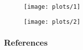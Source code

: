 \documentclass[
    8pt,
    aspectratio=1610,
    c,
    intlimits,
    leqno,
    professionalfonts,
]{beamer}
\begin{document}
\begin{frame}
	\begin{figure}[ht!]
		\centering
		\texttt{[image: plots/1]}
	\end{figure}
\end{frame}

\begin{frame}
	\begin{figure}[ht!]
		\centering
		\texttt{[image: plots/2]}
	\end{figure}
\end{frame}

\begin{frame}
	\frametitle{References}

	\nocite{*}
	\printbibliography[heading=none]
\end{frame}
\end{document}
